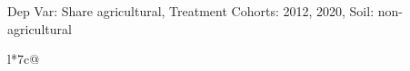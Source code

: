 \begin{table}[H]
\captionlistentry[table]{}
\label{table:beaver_land_class_DVis_land_class_1_SCg13_SSNAG}
\scriptsize %
Dep Var: Share agricultural, Treatment Cohorts: 2012, 2020, Soil: non-agricultural \\
\begin{threeparttable}
\begin{tabulary}{\textwidth}{l*{7}{c}@{}}
\toprule \toprule
\noalign{\smallskip}
\noalign{\smallskip}
\midrule \bottomrule
\end{tabulary}
\medskip
\end{threeparttable}
\end{table}
